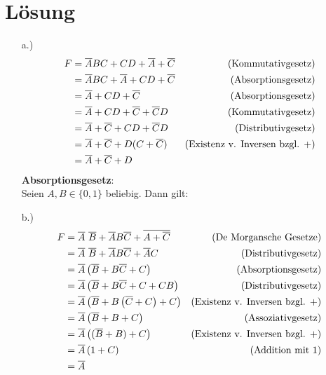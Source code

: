 \documentclass[a4paper,12pt]{article}
\begin{document}
{\section*{Lösung}
\begin{enumerate}
\item[a.)]
\begin{align*}
F &= \overline{A}BC+CD+\overline{A}+\overline{C} & \text{(Kommutativgesetz)} \nonumber \\
 &= \overline{A}BC +\overline{A} +CD +\overline{C} & \text{(Absorptionsgesetz)}  \nonumber \\
 &= \overline{A} +CD +\overline{C}  & \text{(Absorptionsgesetz)}  \nonumber \\
 &= \overline{A} +CD +\overline{C} +\overline{C}D  & \text{(Kommutativgesetz)}  \nonumber \\
&= \overline{A} +\overline{C} +CD +\overline{C}D  & \text{(Distributivgesetz)}  \nonumber \\
&= \overline{A} +\overline{C} +D(C +\overline{C})  & \text{(Existenz v. Inversen bzgl. $+$)}  \nonumber \\
 &= \overline{A} +\overline{C} +D \nonumber
\end{align*}
\textbf{Absorptionsgesetz}:\\
Seien $A,B\in\{0,1\}$ beliebig. Dann gilt:
\item[b.)]
\begin{align*}
F &= \overline{A}~\overline{B}+\overline{A}B\overline{C}+\overline{A+\overline{C}}  & \text{(De Morgansche Gesetze)} \nonumber \\
 &= \overline{A}~\overline{B}+\overline{A}B\overline{C}+\overline{A}C  & \text{(Distributivgesetz)} \nonumber \\
 &= \overline{A}\left( \overline{B} +B\overline{C} +C \right)  & \text{(Absorptionsgesetz)} \nonumber \\
 &= \overline{A}\left( \overline{B} +B\overline{C} +C + CB \right)  & \text{(Distributivgesetz)} \nonumber \\
 &= \overline{A}\left( \overline{B} +B\left( \overline{C} + C \right) +C \right) & \text{(Existenz v. Inversen bzgl. $+$)}  \nonumber \\
 &= \overline{A}\left( \overline{B} +B +C \right)  & \text{(Assoziativgesetz)} \nonumber \\
 &= \overline{A}\left( (\overline{B} +B) +C \right)  & \text{(Existenz v. Inversen bzgl. $+$)} \nonumber \\
 &= \overline{A}\left( 1 +C \right) & \text{(Addition mit $1$)}  \nonumber \\
 &= \overline{A} \nonumber
\end{align*}
\end{enumerate}

}{}
\end{document}
